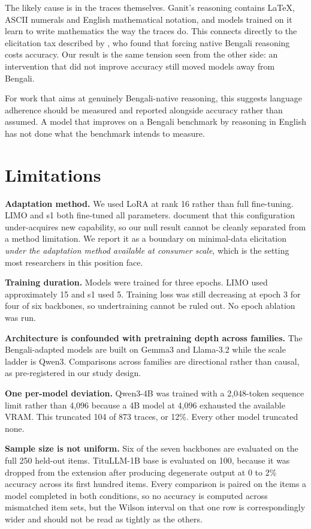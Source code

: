 \documentclass[10pt,twocolumn,letterpaper]{article}
\begin{document}
The likely cause is in the traces themselves. Ganit's reasoning contains LaTeX,
ASCII numerals and English mathematical notation, and models trained on it learn
to write mathematics the way the traces do. This connects directly to the
elicitation tax described by \textcite{qi2025xreasoning}, who found that forcing
native Bengali reasoning costs accuracy. Our result is the same tension seen
from the other side: an intervention that did not improve accuracy still moved
models away from Bengali.

For work that aims at genuinely Bengali-native reasoning, this suggests language
adherence should be measured and reported alongside accuracy rather than
assumed. A model that improves on a Bengali benchmark by reasoning in English
has not done what the benchmark intends to measure.


\section{Limitations}

\textbf{Adaptation method.} We used LoRA at rank 16 rather than full
fine-tuning. LIMO and s1 both fine-tuned all parameters.
\textcite{biderman2024lora} document that this configuration under-acquires new %
capability, so our null result cannot be cleanly separated from a method
limitation. We report it as a boundary on minimal-data elicitation \emph{under
the adaptation method available at consumer scale}, which is the setting most
researchers in this position face.

\textbf{Training duration.} Models were trained for three epochs. LIMO used
approximately 15 and s1 used 5. Training loss was still decreasing at epoch 3
for four of six backbones, so undertraining cannot be ruled out. No epoch
ablation was run.

\textbf{Architecture is confounded with pretraining depth across families.} The
Bengali-adapted models are built on Gemma3 and Llama-3.2 while the scale ladder
is Qwen3. Comparisons across families are directional rather than causal, as
pre-registered in our study design.

\textbf{One per-model deviation.} Qwen3-4B was trained with a 2,048-token
sequence limit rather than 4,096 because a 4B model at 4,096 exhausted the
available VRAM. This truncated 104 of 873 traces, or 12\%. Every other model
truncated none.

\textbf{Sample size is not uniform.} Six of the seven backbones are
evaluated on the full 250 held-out items. TituLLM-1B base is evaluated on
100, because it was dropped from the extension after producing degenerate
output at 0 to 2\% accuracy across its first hundred items. Every
comparison is paired on the items a model completed in both conditions, so
no accuracy is computed across mismatched item sets, but the Wilson
interval on that one row is correspondingly wider and should not be read
as tightly as the others.
\end{document}
